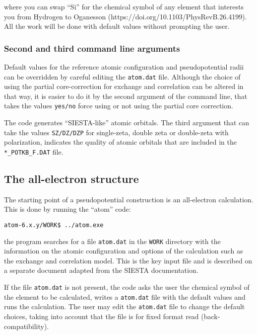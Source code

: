 \documentclass[11pt]{article}
\begin{document}
where you can swap ``Si'' for the chemical symbol of any element
that interests you from Hydrogen to Oganesson (https://doi.org/10.1103/PhysRevB.26.4199).
All the work will be done with default values without prompting the user.

\subsubsection{Second and third command line arguments}

Default values for the reference atomic configuration and pseudopotential radii
can be overridden by careful editing the \texttt{atom.dat} file.  Although the choice of
using the partial core-correction for exchange and correlation can
be altered in that way, it is easier to do it by the second argument of the
command line, that takes the values \texttt{yes/no} force using or not using the
partial core correction.

The code generates ``SIESTA-like'' atomic orbitals.  The third argument
that can take the values \texttt{SZ/DZ/DZP} for single-zeta, double zeta or
double-zeta with polarization, indicates the quality of atomic orbitals
that are included in the \texttt{*\_POTKB\_F.DAT} file.



\subsection{The all-electron structure}
\label{sec:run-ae}

The starting point of a pseudopotential construction is an all-electron calculation.
This is done by running the ``atom'' code:

\noindent\texttt{atom-6.x.y/WORK\$ ../atom.exe}

the program searches for a file \texttt{atom.dat} in the \texttt{WORK} directory with the information on the atomic
configuration and options of the calculation such as the exchange and correlation model.
This is the key input file and is described on a separate document adapted from the SIESTA
documentation.

If the file \texttt{atom.dat} is not present, the code asks the user the chemical symbol of the element to be calculated,
writes a \texttt{atom.dat} file with the default values and runs the calculation.
The user may edit the \texttt{atom.dat} file to change the default choices, taking into account that the
file is for fixed format read (back-compatibility).
\end{document}
